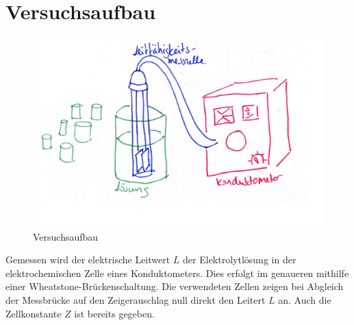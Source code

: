 \documentclass[12pt,a4paper,titlepage,headinclude,bibtotoc]{scrartcl}
\begin{document}
\section{Versuchsaufbau}
\begin{figure} [h!]
\begin{center}
\includegraphics[scale=1]{Versuchsaufbau.png} \end{center}
\caption {Versuchsaufbau}
\end{figure}

Gemessen wird der elektrische Leitwert $L$ der Elektrolytlösung in der elektrochemischen Zelle eines Konduktometers. Dies erfolgt im genaueren mithilfe einer Wheatstone-Brückenschaltung. Die verwendeten Zellen zeigen bei Abgleich der Messbrücke auf den Zeigerauschlag null direkt den Leitert $L$ an. Auch die Zellkonstante $Z$ ist bereits gegeben.
\end{document}
